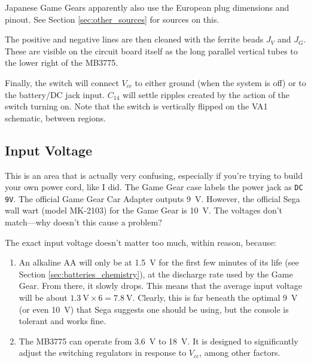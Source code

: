 \documentclass{article}
\newcommand{\Vcc}{$V_{cc}$}
\newcommand{\model}{\textsf}
\begin{document}
Japanese Game Gears apparently also use the European plug dimensions
and pinout. See Section \ref{sec:other_sources} for sources on this.

The positive and negative lines are then cleaned with the ferrite
beads $J_V$ and $J_G$. These are visible on the circuit board itself
as the long parallel vertical tubes to the lower right of the
\model{MB3775}.

Finally, the switch will connect \Vcc{} to either ground (when the
system is off) or to the battery/DC jack input. $C_{14}$ will settle
ripples created by the action of the switch turning on. Note that the
switch is vertically flipped on the \model{VA1} schematic, between
regions.

\subsection{Input Voltage}
This is an area that is actually very confusing, especially if you're
trying to build your own power cord, like I did. The Game Gear case
labels the power jack as \texttt{DC 9V}. The official Game Gear Car
Adapter outputs \qty{9}{\volt}. However, the official Sega wall wart
(model \model{MK-2103}) for the Game Gear is \qty{10}{\volt}. The
voltages don't match---why doesn't this cause a problem?

The exact input voltage doesn't matter too much, within reason,
because:

\begin{enumerate}
\item An alkaline AA will only be at \qty{1.5}{\volt} for the first
  few minutes of its life (see Section \ref{sec:batteries_chemistry}),
  at the discharge rate used by the Game Gear. From there, it slowly
  drops. This means that the average input voltage will be about
  $\qty{1.3}{\volt} \times{} 6 = \qty{7.8}{\volt}$. Clearly, this is
  far beneath the optimal \qty{9}{\volt} (or even \qty{10}{\volt})
  that Sega suggests one should be using, but the console is tolerant
  and works fine.
\item The \model{MB3775} can operate from \qty{3.6}{\volt} to
  \qty{18}{\volt}. It is designed to significantly adjust the
  switching regulators in response to \Vcc{}, among other factors.
\end{enumerate}
\end{document}
